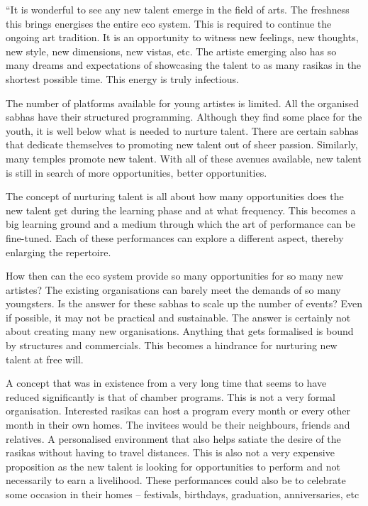 \begin{itemize}
\begin{myquote}
“It is wonderful to see any new talent emerge in the field of arts. The freshness this brings energises the entire eco system. This is required to continue the ongoing art tradition. It is an opportunity to witness new feelings, new thoughts, new style, new dimensions, new vistas, etc. The artiste emerging also has so many dreams and expectations of showcasing the talent to as many rasikas in the shortest possible time. This energy is truly infectious.
\end{myquote}

\begin{myquote}
The number of platforms available for young artistes is limited. All the organised sabhas have their structured programming. Although they find some place for the youth, it is well below what is needed to nurture talent. There are certain sabhas that dedicate themselves to promoting new talent out of sheer passion. Similarly, many temples promote new talent. With all of these avenues available, new talent is still in search of more opportunities, better opportunities.
\end{myquote}

\begin{myquote}
The concept of nurturing talent is all about how many opportunities does the new talent get during the learning phase and at what frequency. This becomes a big learning ground and a medium through which the art of performance can be fine-tuned. Each of these performances can explore a different aspect, thereby enlarging the repertoire.
\end{myquote}

\begin{myquote}
How then can the eco system provide so many opportunities for so many new artistes? The existing organisations can barely meet the demands of so many youngsters. Is the answer for these sabhas to scale up the number of events? Even if possible, it may not be practical and sustainable. The answer is certainly not about creating many new organisations. Anything that gets formalised is bound by structures and commercials. This becomes a hindrance for nurturing new talent at free will.
\end{myquote}

\begin{myquote}
A concept that was in existence from a very long time that seems to have reduced significantly is that of chamber programs. This is not a very formal organisation. Interested rasikas can host a program every month or every other month in their own homes. The invitees would be their neighbours, friends and relatives. A personalised environment that also helps satiate the desire of the rasikas without having to travel distances. This is also not a very expensive proposition as the new talent is looking for opportunities to perform and not necessarily to earn a livelihood. These performances could also be to celebrate some occasion in their homes – festivals, birthdays, graduation, anniversaries, etc
\end{myquote}


\end{itemize}
